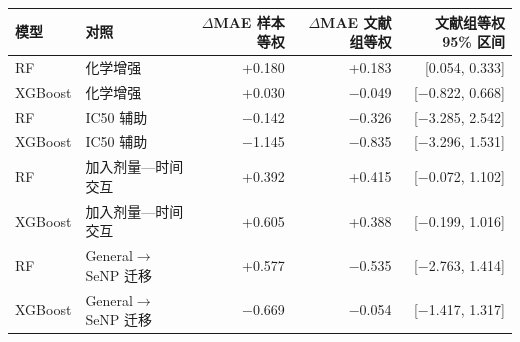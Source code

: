 \begin{tabularx}{\linewidth}{lXrrr}
\toprule
模型 & 对照 & \ensuremath{\Delta}MAE 样本等权 & \ensuremath{\Delta}MAE 文献组等权 & 文献组等权 95\% 区间 \\
\midrule
RF & 化学增强 & +0.180 & +0.183 & [0.054, 0.333] \\
XGBoost & 化学增强 & +0.030 & \ensuremath{\mathord{-}}0.049 & [\ensuremath{\mathord{-}}0.822, 0.668] \\
RF & IC50 辅助 & \ensuremath{\mathord{-}}0.142 & \ensuremath{\mathord{-}}0.326 & [\ensuremath{\mathord{-}}3.285, 2.542] \\
XGBoost & IC50 辅助 & \ensuremath{\mathord{-}}1.145 & \ensuremath{\mathord{-}}0.835 & [\ensuremath{\mathord{-}}3.296, 1.531] \\
RF & 加入剂量—时间交互 & +0.392 & +0.415 & [\ensuremath{\mathord{-}}0.072, 1.102] \\
XGBoost & 加入剂量—时间交互 & +0.605 & +0.388 & [\ensuremath{\mathord{-}}0.199, 1.016] \\
RF & General\ensuremath{\rightarrow}SeNP 迁移 & +0.577 & \ensuremath{\mathord{-}}0.535 & [\ensuremath{\mathord{-}}2.763, 1.414] \\
XGBoost & General\ensuremath{\rightarrow}SeNP 迁移 & \ensuremath{\mathord{-}}0.669 & \ensuremath{\mathord{-}}0.054 & [\ensuremath{\mathord{-}}1.417, 1.317] \\
\bottomrule
\end{tabularx}
